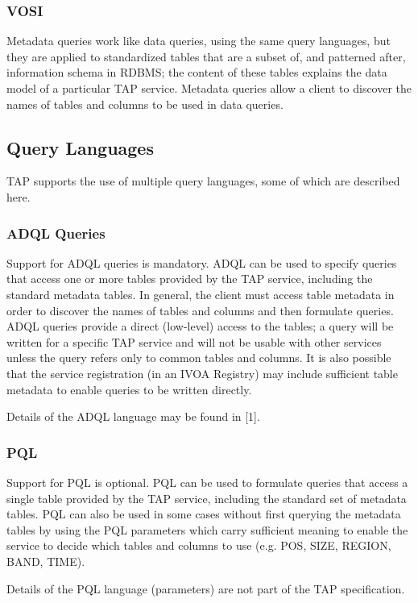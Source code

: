 \documentclass[11pt,a4paper]{ivoa}
\begin{document}
\subsubsection{VOSI}
Metadata queries work like data queries, using the same query languages, but 
they are applied to standardized tables that are a subset of, and patterned 
after, information schema in RDBMS; the content of these tables explains the 
data model of a particular TAP service. Metadata queries allow a client to 
discover the names of tables and columns to be used in data queries.

\subsection{Query Languages}
TAP supports the use of multiple query languages, some of which are described 
here.

\subsubsection{ADQL Queries}
Support for ADQL queries is mandatory. ADQL can be used to specify queries  that 
access one or more tables provided by the TAP service, including the standard 
metadata tables. In general, the client must access table metadata in order to 
discover the names of tables and columns and then formulate queries. ADQL 
queries provide a direct (low-level) access to the tables; a query will be 
written for a specific TAP service and will not be usable with other services 
unless the query refers only to common tables and columns. It is also possible 
that the service registration (in an IVOA Registry)  may include sufficient 
table metadata to enable queries to be written directly.

Details of the ADQL language may be found in [1].

\subsubsection{PQL}
Support for PQL is optional. PQL can be used to formulate queries that access a 
single table provided by the TAP service, including the standard set of metadata 
tables. PQL can also be used in some cases without first querying the metadata 
tables by using the PQL parameters which carry sufficient meaning to enable the 
service to decide which tables and columns to use (e.g. POS, SIZE, REGION, BAND, 
TIME).

Details of the PQL language (parameters) are not part of the TAP specification.
\end{document}
